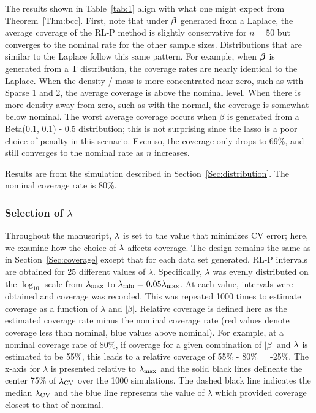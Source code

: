 The results shown in Table~\ref{tab:1} align with what one might expect from Theorem~\ref{Thm:bcc}. First, note that under $\boldsymbol{\beta}$ generated from a Laplace, the average coverage of the RL-P method is slightly conservative for $n=50$ but converges to the nominal rate for the other sample sizes. Distributions that are similar to the Laplace follow this same pattern. For example, when $\boldsymbol{\beta}$ is generated from a T distribution, the coverage rates are nearly identical to the Laplace. When the density / mass is more concentrated near zero, such as with Sparse 1 and 2, the average coverage is above the nominal level. When there is more density away from zero, such as with the normal, the coverage is somewhat below nominal. The worst average coverage occurs when $\beta$ is generated from a Beta(0.1, 0.1) - 0.5 distribution; this is not surprising since the lasso is a poor choice of penalty in this scenario. Even so, the coverage only drops to 69\%, and still converges to the nominal rate as $n$ increases.

\begin{table}[htb!]
  \centering
  
  \caption{\label{tab:1} Results are from the simulation described in Section~\ref{Sec:distribution}. The nominal coverage rate is 80\%.}
\end{table}

\subsubsection{Selection of \texorpdfstring{$\lambda$}{lambda}} \label{Sec:lambda}

Throughout the manuscript, $\lambda$ is set to the value that minimizes CV error; here, we examine how the choice of $\lambda$ affects coverage. The design remains the same as in Section~\ref{Sec:coverage} except that for each data set generated, RL-P intervals are obtained for 25 different values of $\lambda$. Specifically, $\lambda$ was evenly distributed on the $\log_{10}$ scale from $\lambda_{\max}$ to $\lambda_{\min} = 0.05 \lambda_{\max}$. At each value, intervals were obtained and coverage was recorded. This was repeated 1000 times to estimate coverage as a function of $\lambda$ and $|\beta|$. Relative coverage is defined here as the estimated coverage rate minus the nominal coverage rate (red values denote coverage less than nominal, blue values above nominal). For example, at a nominal coverage rate of 80\%, if coverage for a given combination of $|\beta|$ and $\lambda$ is estimated to be 55\%, this leads to a relative coverage of 55\% - 80\% = -25\%. The x-axis for $\lambda$ is presented relative to $\lambda_{\max}$ and the solid black lines delineate the center 75\% of $\lambda_{\textrm{CV}}$ over the 1000 simulations. The dashed black line indicates the median $\lambda_{\textrm{CV}}$ and the blue line represents the value of $\lambda$ which provided coverage closest to that of nominal.

